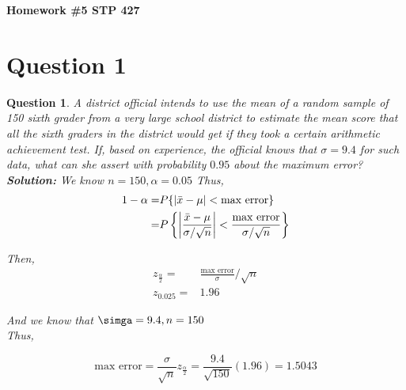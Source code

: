 \documentclass{article}
\theoremstyle{questionstyle}
\newtheorem{myquestion}{Question}
\begin{document}
\begin{center}
    \Large{\textbf{Homework \#5 STP 427}}
\end{center}

\section{Question 1}
\begin{myquestion}
A district official intends to use the mean of a random sample of 150 sixth grader from a very large school district to estimate the mean score that all the sixth graders in the district would get if they took a certain arithmetic achievement test. If, based on experience, the official knows that \(\sigma = 9.4\) for such data, what can she assert with probability \(0.95\) about the maximum error?\\ 

\textbf{Solution:}
We know \(n = 150, \alpha = 0.05\)
Thus, 
\begin{align*}
     1-\alpha =& P \{ |\Bar{x} - \mu| < \text{max error}\}\\
     =& P \left\{ \left|\frac{\Bar{x} - \mu}{\sigma/\sqrt{n}}\right| < \frac{\text{max error}}{\sigma/\sqrt{n}}\right\}
\end{align*}

Then, 
\begin{align*}
    z_{\frac{\alpha}{2}} =& \frac{\text{max error}}{\sigma}/\sqrt{n}\\
    z_{0.025} =& 1.96 
\end{align*}

And we know that \(\simga=9.4, n=150\)\\

Thus,

\[\text{max error} = \frac{\sigma}{\sqrt{n}}z_{\frac{\alpha}{2}} = \frac{9.4}{\sqrt{150}}(1.96) =  1.5043\]

\end{myquestion}
\end{document}
